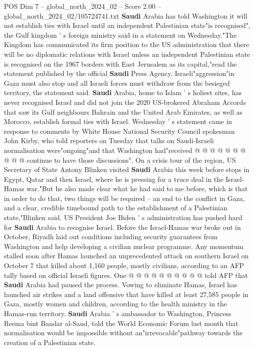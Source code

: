 \begin{textsample}{POS Dim 7 – global\_north\_2024\_02 – Score 2.00 – global\_north\_2024\_02/105724741.txt}  \label{ex:f7_pos_168}
\textbf{Saudi} Arabia has told Washington it will not establish ties with Israel until an independent Palestinian state"is recognised", the Gulf kingdom ' s foreign ministry said in a statement on Wednesday."The Kingdom has communicated its firm position to the US administration that there will be no diplomatic relations with Israel unless an independent Palestinian state is recognised on the 1967 borders with East Jerusalem as its capital,"read the statement published by the official \textbf{Saudi} Press Agency.
Israeli"aggression"in Gaza must also stop and all Israeli forces must withdraw from the besieged territory, the statement said. \textbf{Saudi} Arabia, home to Islam ' s holiest sites, has never recognised Israel and did not join the 2020 US-brokered Abraham Accords that saw its Gulf neighbours Bahrain and the United Arab Emirates, as well as Morocco, establish formal ties with Israel.
Wednesday ' s statement came in response to comments by White House National Security Council spokesman John Kirby, who told reporters on Tuesday that talks on Saudi-Israeli normalisation were"ongoing"and that Washington had"received @ @ @ @ @ @ @ @ @ @ continue to have those discussions".
On a crisis tour of the region, US Secretary of State Antony Blinken visited \textbf{Saudi} Arabia this week before stops in Egypt, Qatar and then Israel, where he is pressing for a truce deal in the Israel-Hamas war."But he also made clear what he had said to me before, which is that in order to do that, two things will be required -- an end to the conflict in Gaza, and a clear, credible timebound path to the establishment of a Palestinian state,"Blinken said.
US President Joe Biden ' s administration has pushed hard for \textbf{Saudi} Arabia to recognise Israel.
Before the Israel-Hamas war broke out in October, Riyadh laid out conditions including security guarantees from Washington and help developing a civilian nuclear programme.
Any momentum stalled soon after Hamas launched an unprecedented attack on southern Israel on October 7 that killed about 1,160 people, mostly civilians, according to an AFP tally based on official Israeli figures.
One @ @ @ @ @ @ @ @ @ @ told AFP that \textbf{Saudi} Arabia had paused the process.
Vowing to eliminate Hamas, Israel has launched air strikes and a land offensive that have killed at least 27,585 people in Gaza, mostly women and children, according to the health ministry in the Hamas-run territory. \textbf{Saudi} Arabia ' s ambassador to Washington, Princess Reema bint Bandar al-Saud, told the World Economic Forum last month that normalisation would be impossible without an"irrevocable"pathway towards the creation of a Palestinian state.

\end{textsample}
